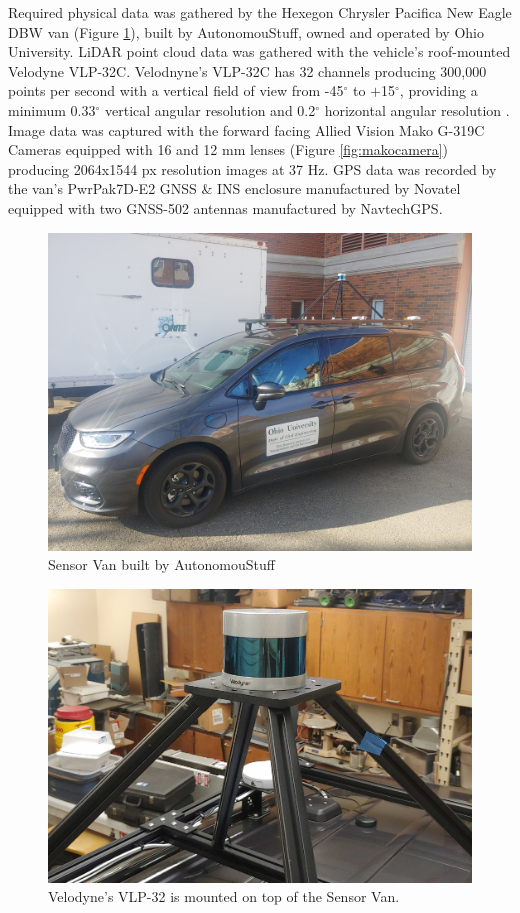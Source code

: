 \documentclass[numbered,pdftex]{ohio-etd}
\begin{document}
{{{{				{Required physical data was gathered by the Hexegon Chrysler Pacifica New Eagle DBW van (Figure \ref{fig:Experimental_Apperatus}), built by AutonomouStuff, owned and operated by Ohio University. LiDAR point cloud data was gathered with the vehicle's roof-mounted Velodyne VLP-32C. Velodnyne's VLP-32C has 32 channels producing 300,000 points per second with a vertical field of view from -45$^{\circ}$ to $+$15$^{\circ}$, providing a minimum 0.33$^{\circ}$ vertical angular resolution and 0.2$^{\circ}$ horizontal angular resolution \cite{vlp_32c}. Image data was captured with the forward facing Allied Vision Mako G-319C Cameras equipped with 16 and 12 mm lenses (Figure \ref{fig:makocamera}) producing 2064x1544 px resolution images at 37 Hz. GPS data was recorded by the van's PwrPak7D-E2 GNSS \& INS enclosure manufactured by Novatel equipped with two GNSS-502 antennas manufactured by NavtechGPS.}
				
				\begin{figure}[H]
					\centering
					\includegraphics[width=0.7\linewidth]{Defense_Images/van_on_van}
					\caption[Sensor Van]{Sensor Van built by AutonomouStuff}
					\label{fig:Experimental_Apperatus}
				\end{figure}
			
				\begin{figure}[H]
					\centering
					\includegraphics[width=0.7\linewidth]{Defense_Images/vlp_32_mount_2}
					\caption[VLP 32 on Van]{Velodyne's VLP-32 is mounted on top of the Sensor Van.}
					\label{fig:vlp32mount}
				\end{figure}
				
}}}}
\end{document}
